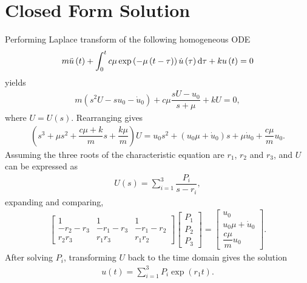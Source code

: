 \appendix
\section{Closed Form Solution}\label{sec:analytical_sdof}
Performing Laplace transform of the following homogeneous ODE
\begin{gather}\label{eq:single_exp}
m\ddot{u}\left(t\right)+\int_0^tc\mu\exp\left(-\mu\left(t-\tau\right)\right)\dot{u}\left(\tau\right)\mathrm{d}\tau+ku\left(t\right)=0
\end{gather}
yields
\begin{gather}
m\left(s^2U-su_0-\dot{u}_0\right)
+c\mu\dfrac{sU-u_0}{s+\mu}
+kU
=0,
\end{gather}
where $U=U\left(s\right)$. Rearranging gives
\begin{gather}
\left(
s^3
+\mu{}s^2
+\dfrac{c\mu+k}{m}s
+\dfrac{k\mu}{m}\right)U
=
u_0s^2
+\left(u_0\mu+\dot{u}_0\right)s
+\mu\dot{u}_0
+\dfrac{c\mu{}}{m}u_0.
\end{gather}
Assuming the three roots of the characteristic equation are $r_1$, $r_2$ and $r_3$, and $U$ can be expressed as
\begin{gather}
U\left(s\right)=\sum_{i=1}^3\dfrac{P_i}{s-r_i},
\end{gather}
expanding and comparing,
\begin{gather}
\begin{bmatrix}
1&1&1\\
-r_2-r_3&-r_1-r_3&-r_1-r_2\\
r_2r_3&r_1r_3&r_1r_2
\end{bmatrix}
\begin{bmatrix}
P_1\\P_2\\P_3
\end{bmatrix}
=
\begin{bmatrix}
u_0\\u_0\mu+\dot{u}_0\\\dfrac{c\mu{}}{m}u_0
\end{bmatrix}.
\end{gather}
After solving $P_i$, transforming $U$ back to the time domain gives the solution
\begin{gather}
u(t)=\sum_{i=1}^3P_i\exp\left(r_1t\right).
\end{gather}

